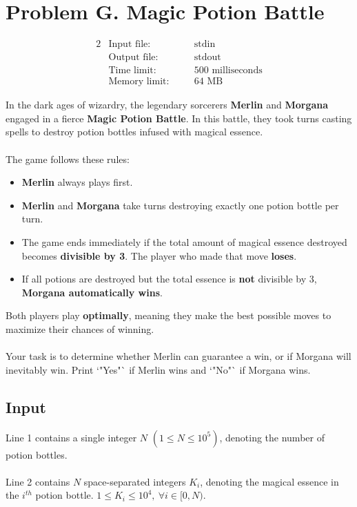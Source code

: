 \documentclass[12pt,a4paper]{article}
\begin{document}
\newpage

\section*{\fontsize{18}{12}Problem G. Magic Potion Battle}

\begin{alignat*} {2}
 &   \text{Input file:}   \quad     &&\text{stdin}\\
 &   \text{Output file:}  \quad     &&\text{stdout}\\
 &   \text{Time limit:}   \quad     &&\text{500 milliseconds}\\
 &   \text{Memory limit:} \quad     &&\text{64 MB}
\end{alignat*}

\noindent
In the dark ages of wizardry, the legendary sorcerers \textbf{Merlin} and \textbf{Morgana} engaged in a fierce \textbf{Magic Potion Battle}. In this battle, they took turns casting spells to destroy potion bottles infused with magical essence. 
\\\\
\noindent
The game follows these rules:
\begin{itemize}
    \item \textbf{Merlin} always plays first.
    \item \textbf{Merlin} and \textbf{Morgana} take turns destroying exactly one potion bottle per turn.
    \item The game ends immediately if the total amount of magical essence destroyed becomes \textbf{divisible by 3}. The player who made that move \textbf{loses}.
    \item If all potions are destroyed but the total essence is \textbf{not} divisible by 3, \textbf{Morgana automatically wins}.
\end{itemize}

\noindent
Both players play \textbf{optimally}, meaning they make the best possible moves to maximize their chances of winning. 
\\\\
\noindent
Your task is to determine whether Merlin can guarantee a win, or if Morgana will inevitably win. Print `"Yes"` if Merlin wins and `"No"` if Morgana wins.

\subsection*{\fontsize{16}{12}Input}
Line 1 contains a single integer \( N \) \((1 \leq N \leq 10^5)\), denoting the number of potion bottles.
\\\\
\noindent
Line 2 contains \( N \) space-separated integers $K_i$, denoting the magical essence in the \( i^{th} \) potion bottle. \( 1 \leq K_i \leq 10^4,\ \forall i\in[0,N)\).
\end{document}
